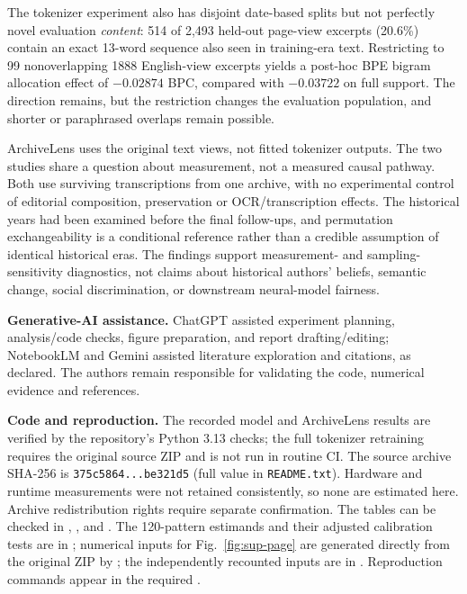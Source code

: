 The tokenizer experiment also has disjoint date-based splits but not
perfectly novel evaluation \emph{content}: 514 of 2,493 held-out
page-view excerpts (20.6\%) contain an exact 13-word sequence also
seen in training-era text. Restricting to 99 nonoverlapping 1888 English-view excerpts yields a
post-hoc BPE bigram allocation effect of $-0.02874$ BPC, compared with
$-0.03722$ on full support. The direction remains, but the restriction
changes the evaluation population, and shorter or paraphrased overlaps
remain possible.

ArchiveLens uses the original text views, not fitted tokenizer
outputs. The two studies share a question about measurement, not a
measured causal pathway. Both use surviving transcriptions from one
archive, with no experimental control of editorial composition,
preservation or OCR/transcription effects. The historical years
had been examined before the final follow-ups, and permutation
exchangeability is a conditional reference rather than a credible
assumption of identical historical eras. The findings support
measurement- and sampling-sensitivity diagnostics, not claims about
historical authors' beliefs, semantic change, social discrimination,
or downstream neural-model fairness.

\noindent\textbf{Generative-AI assistance.}
ChatGPT assisted experiment planning, analysis/code checks, figure preparation,
and report drafting/editing; NotebookLM and Gemini assisted literature
exploration and citations, as declared. The authors remain responsible
for validating the code, numerical evidence and references.

\noindent\textbf{Code and reproduction.}
The recorded model and ArchiveLens results are verified by the
repository's Python 3.13 checks; the full tokenizer retraining requires
the original source ZIP and is not run in routine CI. The source archive
SHA-256 is \texttt{375c5864...be321d5} (full value in
\texttt{README.txt}). Hardware and runtime measurements were not
retained consistently, so none are estimated here. Archive redistribution
rights require separate confirmation.
The tables can be checked in
, , and
. The 120-pattern estimands and their
adjusted calibration tests are in ; numerical inputs for
Fig.~\ref{fig:sup-page} are generated directly from the original ZIP
by ; the independently
recounted inputs are in .
Reproduction commands appear in the required .
